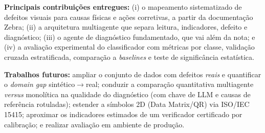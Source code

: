 \documentclass[
	article,			%
	11pt,				%
	oneside,			%
	a4paper,			%
	english,			%
	brazilian,			%
	sumario=tradicional
	]{abntex2}
\begin{document}
\noindent\textbf{Principais contribuições entregues:} (i) o mapeamento
sistematizado de defeitos visuais para causas físicas e ações corretivas, a partir
da documentação Zebra; (ii) a arquitetura multiagente que separa leitura,
indicadores, defeito e diagnóstico; (iii) o agente de diagnóstico fundamentado, que
vai além da nota; e (iv) a avaliação experimental do classificador com métricas por
classe, validação cruzada estratificada, comparação a \textit{baselines} e teste de
significância estatística.

\noindent\textbf{Trabalhos futuros:} ampliar o conjunto de dados com defeitos
\emph{reais} e quantificar o \textit{domain gap} sintético$\rightarrow$real;
conduzir a comparação quantitativa multiagente \textit{versus} monolítica na
qualidade do diagnóstico (com chave de LLM e causas de referência rotuladas);
estender a símbolos 2D (Data Matrix/QR) via ISO/IEC 15415; aproximar os indicadores
estimados de um verificador certificado por calibração; e realizar avaliação em
ambiente de produção.

\postextual


\end{document}
